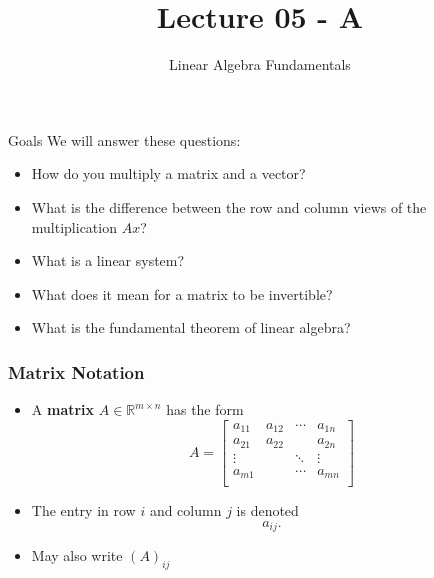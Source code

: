 \documentclass[10pt]{beamer}
\title[Math/CS 375]{Lecture 05 - A}
\subtitle{Linear Algebra Fundamentals}
\begin{document}
\begin{frame}
  \titlepage
\end{frame}

\begin{frame}{Goals}
We will answer these questions:\\[3mm]
\begin{itemize}
    \item How do you multiply a matrix and a vector? 
    \item What is the difference between the row and column views of the multiplication $Ax$?
    \item What is a linear system? 
    \item What does it mean for a matrix to be invertible? 
    \item What is the fundamental theorem of linear algebra?
\end{itemize}
\end{frame}

\begin{frame}[fragile]
\frametitle{Matrix Notation}
\begin{itemize}
\item A \textbf{matrix} $A \in \mathbb{R}^{m\times n}$  has the form 
\begin{equation*}
    A = \begin{bmatrix} a_{11} & a_{12} & \cdots & a_{1n} \\
                        a_{21} & a_{22} &        & a_{2n} \\
                        \vdots &        & \ddots & \vdots \\
                        a_{m1} &        & \cdots & a_{mn} \\
        \end{bmatrix}
\end{equation*}
\vfill 

\item The entry in row $i$ and column $j$ is denoted
\begin{equation*}
    a_{ij}.
\end{equation*}
\vfill 
\item May also write $(A)_{ij}$
\vfill 
\end{itemize}
\end{frame}
\end{document}
